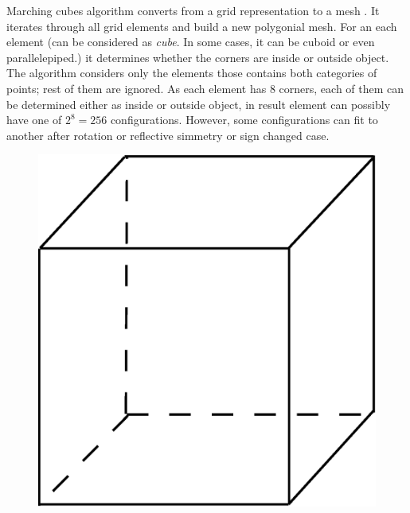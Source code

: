 Marching cubes algorithm converts from a grid representation to a mesh \cite{Lorensen1987}. It iterates through
all grid elements and build a new polygonial mesh. For an each element (can be considered as \emph{cube}.
In some cases, it can be cuboid or even parallelepiped.)
it determines whether the corners are inside or outside object. The algorithm considers only the elements
those contains both categories of points; rest of them are ignored. As each element has 8 corners,
each of them can be determined either as inside or outside object, in result element can possibly
have one of $2^8 = 256$ configurations. However, some configurations can fit to another after rotation
or reflective simmetry or sign changed case.\\


\begin{figure}[ht]
\includegraphics[scale=0.15]{../img/mar_cub_case0.eps}

\end{figure}
